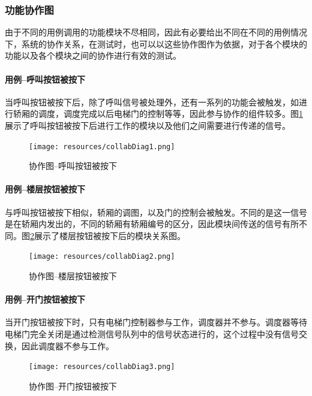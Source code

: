 \subsubsection{功能协作图}
由于不同的用例调用的功能模块不尽相同，因此有必要给出不同在不同的用例情况下，系统的协作关系，在测试时，也可以以这些协作图作为依据，对于各个模块的功能以及各个模块之间的协作进行有效的测试。\\ \par

\begin{minipage}{\textwidth}
\paragraph{用例--呼叫按钮被按下}
当呼叫按钮被按下后，除了呼叫信号被处理外，还有一系列的功能会被触发，如进行轿厢的调度，调度完成以后电梯门的控制等等，因此参与协作的组件较多。图\ref{fig:collabDiag1}展示了呼叫按钮被按下后进行工作的模块以及他们之间需要进行传递的信号。

\begin{figure}[H]
	\centering
	\texttt{[image: resources/collabDiag1.png]}
	\caption{协作图--呼叫按钮被按下}
	\label{fig:collabDiag1}
\end{figure}
\end{minipage}

\begin{minipage}{\textwidth}
\paragraph{用例--楼层按钮被按下}
与呼叫按钮被按下相似，轿厢的调图，以及门的控制会被触发。不同的是这一信号是在轿厢内发出的，不同的轿厢有轿厢编号的区分，因此模块间传送的信号有所不同。图\ref{fig:collabDiag2}展示了楼层按钮被按下后的模块关系图。

\begin{figure}[H]
	\centering
	\texttt{[image: resources/collabDiag2.png]}
	\caption{协作图--楼层按钮被按下}
	\label{fig:collabDiag2}
\end{figure}
\end{minipage}

\begin{minipage}{\textwidth}
\paragraph{用例--开门按钮被按下}
当开门按钮被按下时，只有电梯门控制器参与工作，调度器并不参与。调度器等待电梯门完全关闭是通过检测信号队列中的信号状态进行的，这个过程中没有信号交换，因此调度器不参与工作。

\begin{figure}[H]
	\centering
	\texttt{[image: resources/collabDiag3.png]}
	\caption{协作图--开门按钮被按下}
	\label{fig:collabDiag3}
\end{figure}
\end{minipage}

